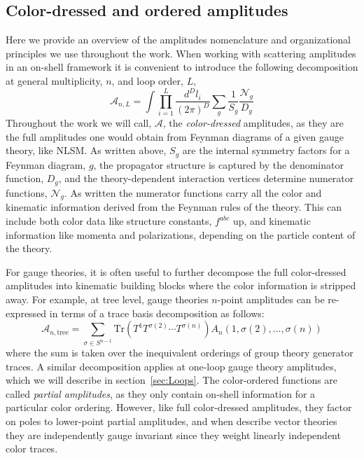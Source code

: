 \documentclass[12pt,letter]{article}
\def\sect#1{section~\ref{#1}}
\def\be{\begin{equation}}
\def\ee{\end{equation}}
\begin{document}
\subsection{Color-dressed and ordered amplitudes}
Here we provide an overview of the amplitudes nomenclature and organizational principles we use throughout the work. When working with scattering amplitudes in an on-shell framework it is convenient to introduce the following decomposition at general multiplicity, $n$, and loop order, $L$,
\be\label{fullAmp}
\mathcal{A}_{n,L} = \int \prod_{i=1}^L\frac{d^D l_i}{(2\pi)^D} \sum_{g} \frac{1}{S_g}\frac{\mathcal{N}_g}{D_g}
\ee
Throughout the work we will call, $\mathcal{A}$, the \textit{color-dressed} amplitudes, as they are the full amplitudes one would obtain from Feynman diagrams of a given gauge theory, like NLSM. As written above, $S_g$ are the internal symmetry factors for a Feynman diagram, $g$, the propagator structure is captured by the denominator function, $D_g$, and the theory-dependent interaction vertices determine numerator functions, $\mathcal{N}_g$. As written the numerator functions carry all the color and kinematic information derived from the Feynman rules of the theory. This can include both color data like structure constants, $f^{abc}$ up, and kinematic information like momenta and polarizations, depending on the particle content of the theory. 

For gauge theories, it is often useful to further decompose the full color-dressed amplitudes into kinematic building blocks where the color information is stripped away. For example, at tree level, gauge theories $n$-point amplitudes can be re-expressed in terms of a trace basis decomposition as follows:
\be
\mathcal{A}_{n,\text{tree}} = \sum_{\sigma \in S^{n-1}} \text{Tr}(T^1 T^{\sigma(2)}\cdots T^{\sigma(n)}) A_n(1,\sigma(2),...,\sigma(n))
\ee
where the sum is taken over the inequivalent orderings of group theory generator traces. A similar decomposition applies at one-loop gauge theory amplitudes, which we will describe in \sect{sec:Loops}. The color-ordered functions are called \textit{partial amplitudes}, as they only contain on-shell information for a particular color ordering. However, like full color-dressed amplitudes, they factor on poles to lower-point partial amplitudes, and when describe vector theories they are independently gauge invariant since they weight linearly independent color traces. 
\end{document}
